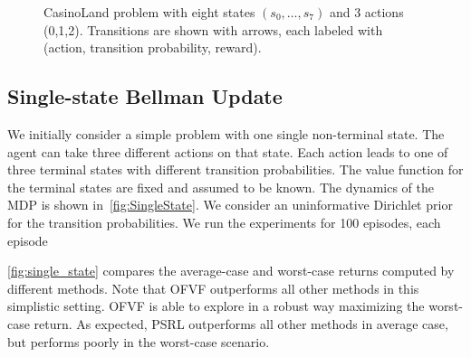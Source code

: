 \documentclass{article}
\theoremstyle{plain}
\theoremstyle{definition}
\begin{document}
\begin{figure}
\begin{center}
	\end{center}
	\caption{CasinoLand problem with eight states $(s_0,\ldots,s_7)$ and 3 actions (0,1,2). Transitions are shown with arrows, each labeled with (action, transition probability, reward).} \label{fig:CasinoLand}
\end{figure}

\subsection{Single-state Bellman Update} \label{ssection:single_state}

We initially consider a simple problem with one single non-terminal state. The agent can take three different actions on that state. Each action leads to one of three terminal states with different transition probabilities. The value function for the terminal states are fixed and assumed to be known. The dynamics of the MDP is shown in~\cref{fig:SingleState}. We consider an uninformative Dirichlet prior for the transition probabilities. We run the experiments for 100 episodes, each episode 

\cref{fig:single_state} compares the average-case and worst-case returns computed by different methods. Note that OFVF outperforms all other methods in this simplistic setting. OFVF is able to explore in a robust way maximizing the worst-case return. As expected, PSRL outperforms all other methods in average case, but performs poorly in the worst-case scenario.
\end{document}
